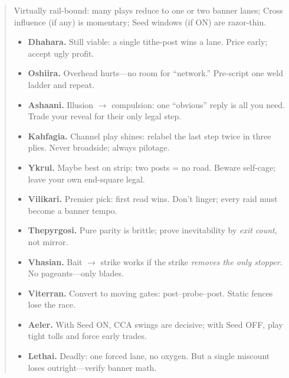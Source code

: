 \documentclass[11pt]{article}
\begin{document}
\begin{quote}
\begin{tcolorbox}[enhanced,breakable,title={2$\times$4 Micro-Strip — What Survives},
  colback=white,colframe=royal,boxrule=0.8pt]
\small
\noindent Virtually rail-bound: many plays reduce to one or two banner lanes; Cross influence (if any) is momentary; Seed windows (if ON) are razor-thin.
\begin{itemize}[leftmargin=1.1em,itemsep=0.3em]

\item \textbf{Dhahara.} Still viable: a single tithe-post wins a lane. Price early; accept ugly profit.

\item \textbf{Oshiira.} Overhead hurts—no room for “network.” Pre-script one weld ladder and repeat.

\item \textbf{Ashaani.} Illusion $\rightarrow$ compulsion: one “obvious” reply is all you need. Trade your reveal for their only legal step.

\item \textbf{Kahfagia.} Channel play shines: relabel the last step twice in three plies. Never broadside; always pilotage.

\item \textbf{Ykrul.} Maybe best on strip: two posts = no road. Beware self-cage; leave your own end-square legal.

\item \textbf{Vilikari.} Premier pick: first read wins. Don’t linger; every raid must become a banner tempo.

\item \textbf{Thepyrgosi.} Pure parity is brittle; prove inevitability by \emph{exit count}, not mirror.

\item \textbf{Vhasian.} Bait $\rightarrow$ strike works if the strike \emph{removes the only stopper}. No pageants—only blades.

\item \textbf{Viterran.} Convert to moving gates: post–probe–post. Static fences lose the race.

\item \textbf{Aeler.} With Seed ON, CCA swings are decisive; with Seed OFF, play tight tolls and force early trades.

\item \textbf{Lethai.} Deadly: one forced lane, no oxygen. But a single miscount loses outright—verify banner math.


\end{itemize}
\end{tcolorbox}
\end{quote}
\end{document}
